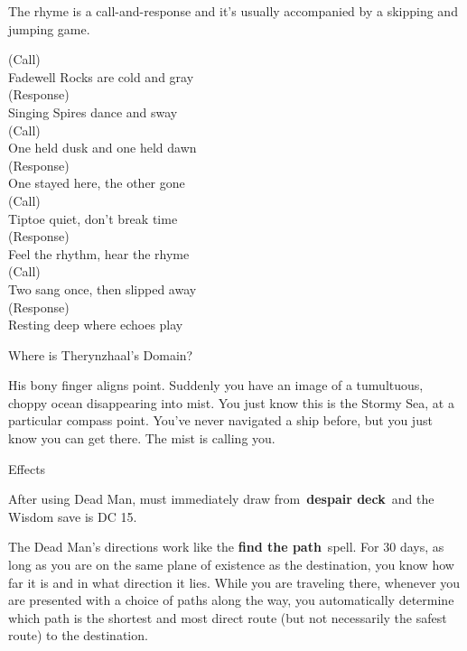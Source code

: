 \documentclass[10pt,twocolumn]{article}
\renewcommand{\textsc}[1]{\XCharterSC#1}
\newcommand{\stickysubsubsection}{\needspace{3\baselineskip}}
\let\oldtextbf\textbf
\renewcommand{\textbf}[1]{\oldtextbf{{#1}}}
\renewenvironment{quote}
  {%
    \begingroup
      \setlength{\parindent}{1em}%
      \setlength{\parskip}{0pt}%
      \begin{tcolorbox}[myquote,
        before upper={%
          \let\textbf\oldtextbf
          \setlength{\parindent}{1.5em}%
          \setlength{\parskip}{0pt}%
          \noindent              %
        }%
      ]%
  }
  {%
      \end{tcolorbox}%
    \endgroup
  }
\begin{document}
The rhyme is a call-and-response and it's usually accompanied by a
skipping and jumping game.

\begin{quote}
(Call)\\
Fadewell Rocks are cold and gray\\
(Response)\\
Singing Spires dance and sway\\
(Call)\\
One held dusk and one held dawn\\
(Response)\\
One stayed here, the other gone\\
(Call)\\
Tiptoe quiet, don't break time\\
(Response)\\
Feel the rhythm, hear the rhyme\\
(Call)\\
Two sang once, then slipped away\\
(Response)\\
Resting deep where echoes play
\end{quote}

\vspace{6pt}\noindent\stickysubsubsection

{\headerfont\normalsize \color{subsubsectioncolor}Where is Therynzhaal’s Domain?}

\par

\begin{quote}
His bony finger aligns point. Suddenly you have an image of a
tumultuous, choppy ocean disappearing into mist. You just know this is
the Stormy Sea, at a particular compass point. You've never navigated a
ship before, but you just know you can get there. The mist is calling
you.
\end{quote}

\vspace{6pt}\noindent\stickysubsubsection

{\headerfont\normalsize \color{subsubsectioncolor}Effects}

\par

After using Dead Man, must immediately draw
from~\textcolor{keywordcolor}{\textbf{\textsc{despair deck}}}~and the
Wisdom save is DC 15.

The Dead Man's directions work like the
\textcolor{keywordcolor}{\textbf{\textsc{find the path}}}~spell. For 30
days, as long as you are on the same plane of existence as the
destination, you know how far it is and in what direction it lies. While
you are traveling there, whenever you are presented with a choice of
paths along the way, you automatically determine which path is the
shortest and most direct route (but not necessarily the safest route) to
the destination.
\end{document}

